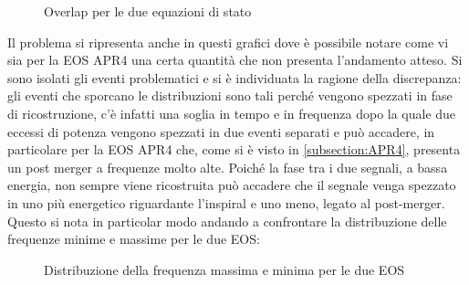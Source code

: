 \begin{figure}[H]
	\vspace{-5pt}
	\caption{Overlap per le due equazioni di stato}
	\label{fig:Overlap_SHT2_APR4}
	\vspace{-15pt}
\end{figure}
Il problema si ripresenta anche in questi grafici dove è possibile notare come vi sia per la EOS APR4 una certa quantità che non presenta l'andamento atteso. Si sono isolati gli eventi problematici e si è individuata la ragione della discrepanza: gli eventi che sporcano le distribuzioni sono tali perché vengono spezzati in fase di ricostruzione, c'è infatti una soglia in tempo e in frequenza dopo la quale due eccessi di potenza vengono spezzati in due eventi separati e può accadere, in particolare per la EOS APR4 che, come si è visto in \ref{subsection:APR4}, presenta un post merger a frequenze molto alte. Poiché la fase tra i due segnali, a bassa energia, non sempre viene ricostruita può accadere che il segnale venga spezzato in uno più energetico riguardante l'inspiral e uno meno, legato al post-merger. Questo si nota in particolar modo andando a confrontare la distribuzione delle frequenze minime e massime per le due EOS:
\begin{figure}[H]
	\vspace{-25pt}
	\centering
	\vspace{-5pt}
	\caption{Distribuzione della frequenza massima e minima per le due EOS}
	\label{fig:Ffrequency_max_min}
	\vspace{-15pt}
\end{figure}
